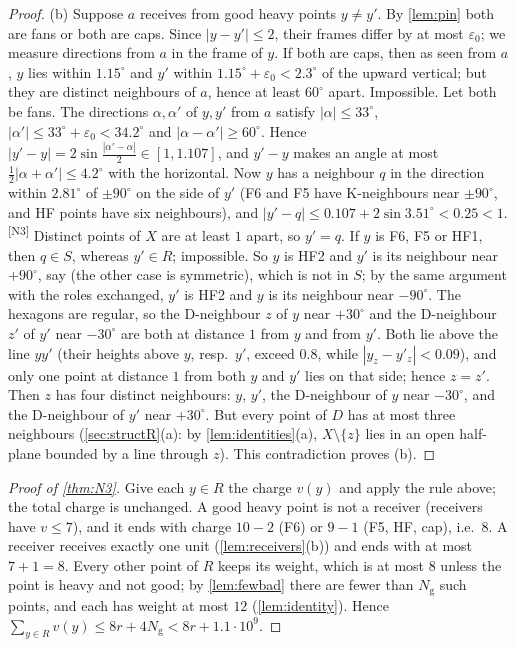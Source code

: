 \documentclass[11pt]{amsart}
\theoremstyle{definition}
\theoremstyle{remark}
\newcommand{\eps}{\varepsilon}
\newcommand{\chk}[1]{\textsuperscript{[#1]}}
\begin{document}
\begin{proof}
(b) Suppose $a$ receives from good heavy points $y\neq y'$. By \cref{lem:pin} both are fans or both are caps. Since $|y-y'|\le2$, their frames differ by at most $\eps_0$; we measure directions from $a$ in the frame of $y$. If both are caps, then as seen from $a$, $y$ lies within $1.15^\circ$ and $y'$ within $1.15^\circ+\eps_0<2.3^\circ$ of the upward vertical; but they are distinct neighbours of $a$, hence at least $60^\circ$ apart. Impossible. Let both be fans. The directions $\alpha,\alpha'$ of $y,y'$ from $a$ satisfy $|\alpha|\le33^\circ$, $|\alpha'|\le33^\circ+\eps_0<34.2^\circ$ and $|\alpha-\alpha'|\ge60^\circ$. Hence $|y'-y|=2\sin\frac{|\alpha'-\alpha|}2\in[1,1.107]$, and $y'-y$ makes an angle at most $\frac12|\alpha+\alpha'|\le4.2^\circ$ with the horizontal. Now $y$ has a neighbour $q$ in the direction within $2.81^\circ$ of $\pm90^\circ$ on the side of $y'$ (F6 and F5 have K-neighbours near $\pm90^\circ$, and HF points have six neighbours), and $|y'-q|\le0.107+2\sin3.51^\circ<0.25<1$.\chk{N3} Distinct points of $X$ are at least $1$ apart, so $y'=q$. If $y$ is F6, F5 or HF1, then $q\in S$, whereas $y'\in R$; impossible. So $y$ is HF2 and $y'$ is its neighbour near $+90^\circ$, say (the other case is symmetric), which is not in $S$; by the same argument with the roles exchanged, $y'$ is HF2 and $y$ is its neighbour near $-90^\circ$. The hexagons are regular, so the D-neighbour $z$ of $y$ near $+30^\circ$ and the D-neighbour $z'$ of $y'$ near $-30^\circ$ are both at distance $1$ from $y$ and from $y'$. Both lie above the line $yy'$ (their heights above $y$, resp.\ $y'$, exceed $0.8$, while $|y_z-y'_z|<0.09$), and only one point at distance $1$ from both $y$ and $y'$ lies on that side; hence $z=z'$. Then $z$ has four distinct neighbours: $y$, $y'$, the D-neighbour of $y$ near $-30^\circ$, and the D-neighbour of $y'$ near $+30^\circ$. But every point of $D$ has at most three neighbours (\cref{sec:structR}(a): by \cref{lem:identities}(a), $X\setminus\{z\}$ lies in an open half-plane bounded by a line through $z$). This contradiction proves (b).
\end{proof}

\begin{proof}[Proof of \cref{thm:N3}]
Give each $y\in R$ the charge $v(y)$ and apply the rule above; the total charge is unchanged. A good heavy point is not a receiver (receivers have $v\le7$), and it ends with charge $10-2$ (F6) or $9-1$ (F5, HF, cap), i.e.\ $8$. A receiver receives exactly one unit (\cref{lem:receivers}(b)) and ends with at most $7+1=8$. Every other point of $R$ keeps its weight, which is at most $8$ unless the point is heavy and not good; by \cref{lem:fewbad} there are fewer than $N_{\mathrm g}$ such points, and each has weight at most $12$ (\cref{lem:identity}). Hence $\sum_{y\in R}v(y)\le8r+4N_{\mathrm g}<8r+1.1\cdot10^9$.
\end{proof}
\end{document}
